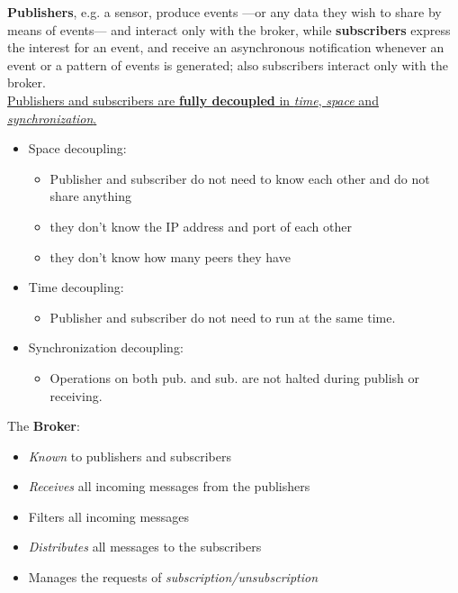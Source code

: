 \textbf{Publishers}, e.g. a sensor, produce events ---or any data they wish to share by means of events---
and interact only with the broker, while \textbf{subscribers} express the interest for an event, and receive an asynchronous notification whenever an event or a pattern of events is generated;
also subscribers interact only with the broker.\\
\ul{Publishers and subscribers are \textbf{fully decoupled} in \textit{time}, \textit{space} and \textit{synchronization}.}
\begin{itemize}
   \item Space decoupling:
   \begin{itemize}
      \item Publisher and subscriber do not need to know each other
      and do not share anything
      \item they don’t know the IP address and port of each other
      \item they don’t know how many peers they have
   \end{itemize}
   \item Time decoupling:
   \begin{itemize}
      \item Publisher and subscriber do not need to run at the same
      time.
   \end{itemize}
   \item Synchronization decoupling:
   \begin{itemize}
      \item Operations on both pub. and sub. are not halted during
      publish or receiving.
   \end{itemize}
\end{itemize}

The \textbf{Broker}:
\begin{itemize}
   \item \textit{Known} to publishers and subscribers
   \item \textit{Receives} all incoming messages from the publishers
   \item Filters all incoming messages
   \item \textit{Distributes} all messages to the subscribers
   \item Manages the requests of \textit{subscription/unsubscription}
\end{itemize}

